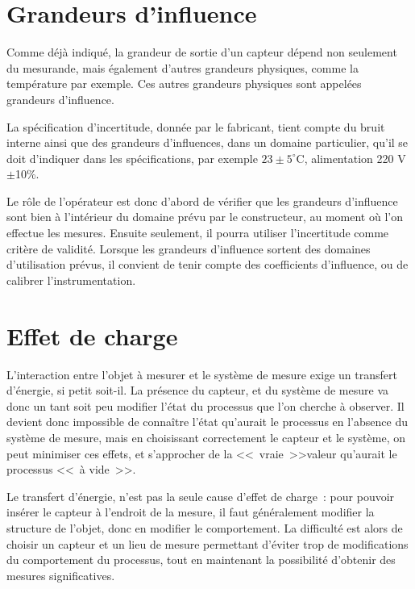 \section{Grandeurs d'influence}

Comme déjà indiqué, la grandeur de sortie d'un capteur dépend non seulement du mesurande, mais également d'autres grandeurs physiques, comme la température par exemple. Ces autres grandeurs physiques sont appelées grandeurs d'influence.

La spécification d'incertitude, donnée par le fabricant, tient compte du bruit interne ainsi que des grandeurs d'influences, dans un domaine particulier, qu'il se doit d'indiquer dans les spécifications, par exemple $23\pm5^\circ$C, alimentation 220 V$\pm$10\%.

Le rôle de l'opérateur est donc d'abord de vérifier que les grandeurs d'influence sont bien à l'intérieur du domaine prévu par le constructeur, au moment où l'on effectue les mesures. Ensuite seulement, il pourra utiliser l'incertitude comme critère de validité. Lorsque les grandeurs d'influence sortent des domaines d'utilisation prévus, il convient de tenir compte des coefficients d'influence, ou de calibrer l'instrumentation.

\section{Effet de charge}

L'interaction entre l'objet à mesurer et le système de mesure exige un transfert d'énergie, si petit soit-il. La présence du capteur, et du système de mesure va donc un tant soit peu modifier l'état du processus que l'on cherche à observer. Il devient donc impossible de connaître l'état qu'aurait le processus en l'absence du système de mesure, mais en choisissant correctement le capteur et le système, on peut minimiser ces effets, et s'approcher de la \textless\textless\ vraie\ \textgreater\textgreater valeur qu'aurait le processus \textless\textless\ à vide\ \textgreater\textgreater.

Le transfert d'énergie, n'est pas la seule cause d'effet de charge~: pour pouvoir insérer le capteur à l'endroit de la mesure, il faut généralement modifier la structure de l'objet, donc en modifier le comportement. La difficulté est alors de choisir un capteur et un lieu de mesure permettant d'éviter trop de modifications du comportement du processus, tout en maintenant la possibilité d'obtenir des mesures significatives.
\begin{center}
\end{center}

